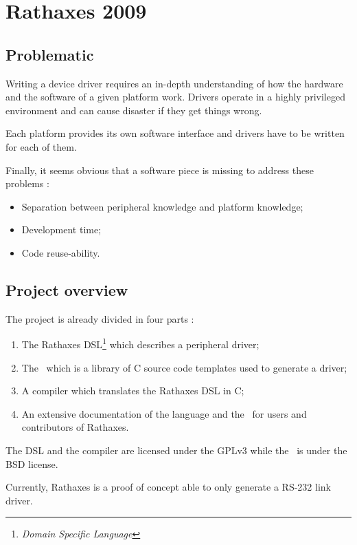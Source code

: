 \section{Rathaxes 2009}

\subsection{Problematic}

Writing a device driver requires an in-depth understanding of how the hardware
and the software of a given platform work. Drivers operate in a highly
privileged environment and can cause disaster if they get things
wrong\cite{linux-tutorial}.

Each platform provides its own software interface and drivers have to be
written for each of them.

Finally, it seems obvious that a software piece is missing to address these
problems :
\begin{itemize}
\item Separation between peripheral knowledge and platform knowledge;
\item Development time;
\item Code reuse-ability.
\end{itemize}

\subsection{Project overview}

The project is already divided in four parts :
\begin{enumerate}
\item The Rathaxes DSL\footnote{\emph{Domain Specific Language}} which
describes a peripheral driver;
\item The \BL\ which is a library of C source code templates used to
generate a driver;
\item A compiler which translates the Rathaxes DSL in C;
\item An extensive documentation of the language and the \BL\ for
users and contributors of Rathaxes.
\end{enumerate}

The DSL and the compiler are licensed under the GPLv3\cite{GPLv3} while the
\BL\ is under the BSD\cite{BSD} license.

Currently, Rathaxes is a proof of concept able to only generate a RS-232 link
driver.
